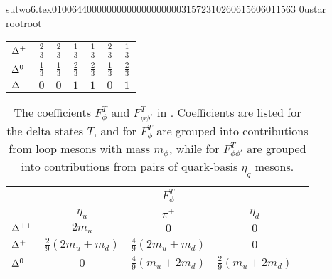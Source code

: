                                                                                                                                                                                                                                                                                       sutwo6.tex                                                                                          0100644 0000000 0000000 00000315723 10260615606 011563  0                                                                                                    ustar   root                            root                                                                                                                                                                                                                   \documentclass[prd,amssymb,amsmath,showpacs,nofootinbib,superscriptaddress]{revtex4}
\begin{document}
\begin{table}[ht]
\begin{tabular}{l | c c c c | c c}
${\Delta}^+$ 
  & $\frac{2}{3}$ 
  & $\frac{2}{3}$  
  & $\frac{1}{3}$ 
  & $\frac{1}{3}$
  & $\frac{2}{3}$ 
  & $\frac{1}{3}$ \\

${\Delta}^0$    
  & $\frac{1}{3}$ 
  & $\frac{1}{3}$  
  & $\frac{2}{3}$ 
  & $\frac{2}{3}$ 
  & $\frac{1}{3}$ 
  & $\frac{2}{3}$ \\

${\Delta}^-$ 
  & $0$ 
  & $0$  
  & $1$ 
  & $1$ 
  & $0$ 
  & $1$ \\
\end{tabular}
\label{t:PQQCD-C}
\end{table}

\begin{table}[ht]
\caption{The coefficients  $F^T_\phi$ and $F^T_{\phi\phi'}$ in \PQCPT. Coefficients are
listed for the delta states $T$, and for $F^T_\phi$ are grouped into contributions from loop mesons
with mass $m_\phi$, while for $F^T_{\phi\phi'}$ are grouped into contributions from pairs of quark-basis 
$\eta_q$ mesons.}
\begin{tabular}{l | c c c c }
& \multicolumn{4}{c}{$F^T_\phi \phantom{ap}$} \\
      & $\quad \eta_u \quad$ & $\quad \pi^\pm \quad $ & $\quad \eta_d \quad $ & \\  
\hline
${\Delta}^{++}$       
           &  $2 m_u$ & $0$  & $0$ &\\

${\Delta}^+$ 
           &  $\frac{2}{9}(2 m_u + m_d)$ & $\frac{4}{9} ( 2 m_u + m_d)$  & $0$ &\\            

${\Delta}^0$    
           &  $0$ & $\frac{4}{9} ( m_u + 2 m_d )$  & $\frac{2}{9}(m_u + 2 m_d)$ &\\ 


\end{tabular}
\end{table}
\end{document}
